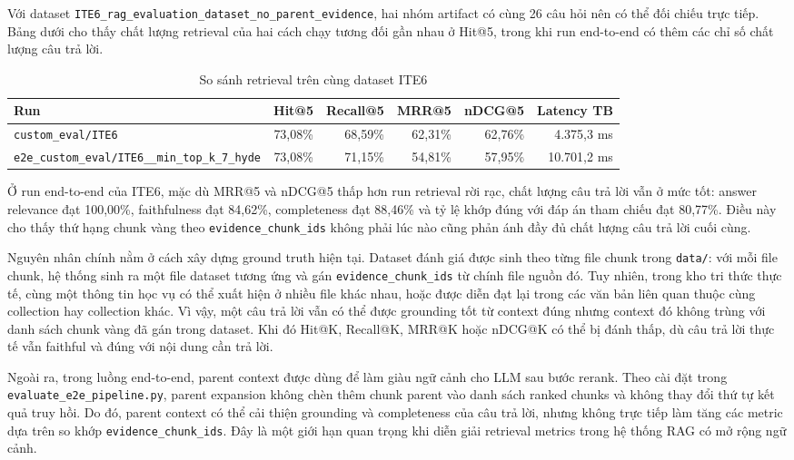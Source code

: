 Với dataset \texttt{ITE6\_rag\_evaluation\_dataset\_no\_parent\_evidence}, hai
nhóm artifact có cùng 26 câu hỏi nên có thể đối chiếu trực tiếp. Bảng dưới cho
thấy chất lượng retrieval của hai cách chạy tương đối gần nhau ở Hit@5, trong
khi run end-to-end có thêm các chỉ số chất lượng câu trả lời.

\begin{table}[H]
\centering
\small
\begin{tabular}{|p{4.9cm}|r|r|r|r|r|}
\hline
\textbf{Run} & \textbf{Hit@5} & \textbf{Recall@5} & \textbf{MRR@5} & \textbf{nDCG@5} & \textbf{Latency TB} \\
\hline
\texttt{custom\_eval/ITE6} & 73,08\% & 68,59\% & 62,31\% & 62,76\% & 4.375,3 ms \\
\hline
\texttt{e2e\_custom\_eval/ITE6\_\_min\_top\_k\_7\_hyde} & 73,08\% & 71,15\% & 54,81\% & 57,95\% & 10.701,2 ms \\
\hline
\end{tabular}
\caption{So sánh retrieval trên cùng dataset ITE6}
\end{table}

Ở run end-to-end của ITE6, mặc dù MRR@5 và nDCG@5 thấp hơn run retrieval rời
rạc, chất lượng câu trả lời vẫn ở mức tốt: answer relevance đạt 100,00\%,
faithfulness đạt 84,62\%, completeness đạt 88,46\% và tỷ lệ khớp đúng với đáp
án tham chiếu đạt 80,77\%. Điều này cho thấy thứ hạng chunk vàng theo
\texttt{evidence\_chunk\_ids} không phải lúc nào cũng phản ánh đầy đủ chất
lượng câu trả lời cuối cùng.

Nguyên nhân chính nằm ở cách xây dựng ground truth hiện tại. Dataset đánh giá
được sinh theo từng file chunk trong \texttt{data/}: với mỗi file chunk, hệ
thống sinh ra một file dataset tương ứng và gán \texttt{evidence\_chunk\_ids}
từ chính file nguồn đó. Tuy nhiên, trong kho tri thức thực tế, cùng một thông
tin học vụ có thể xuất hiện ở nhiều file khác nhau, hoặc được diễn đạt lại
trong các văn bản liên quan thuộc cùng collection hay collection khác. Vì vậy,
một câu trả lời vẫn có thể được grounding tốt từ context đúng nhưng context đó
không trùng với danh sách chunk vàng đã gán trong dataset. Khi đó Hit@K,
Recall@K, MRR@K hoặc nDCG@K có thể bị đánh thấp, dù câu trả lời thực tế vẫn
faithful và đúng với nội dung cần trả lời.

Ngoài ra, trong luồng end-to-end, parent context được dùng để làm giàu ngữ cảnh
cho LLM sau bước rerank. Theo cài đặt trong
\texttt{evaluate\_e2e\_pipeline.py}, parent expansion không chèn thêm chunk
parent vào danh sách ranked chunks và không thay đổi thứ tự kết quả truy hồi.
Do đó, parent context có thể cải thiện grounding và completeness của câu trả
lời, nhưng không trực tiếp làm tăng các metric dựa trên so khớp
\texttt{evidence\_chunk\_ids}. Đây là một giới hạn quan trọng khi diễn giải
retrieval metrics trong hệ thống RAG có mở rộng ngữ cảnh.

